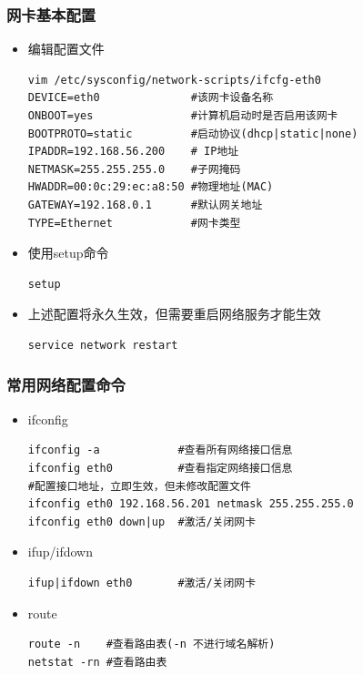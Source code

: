 \documentclass[xcolor=svgnames,presentation]{beamer}
\begin{document}
\begin{frame}[fragile]
\frametitle{网卡基本配置}
\label{sec-1-3}
\begin{itemize}

\item 编辑配置文件\\
\label{sec-1-3-1}%
\begin{verbatim}
vim /etc/sysconfig/network-scripts/ifcfg-eth0
DEVICE=eth0              #该网卡设备名称
ONBOOT=yes               #计算机启动时是否启用该网卡
BOOTPROTO=static         #启动协议(dhcp|static|none)
IPADDR=192.168.56.200    # IP地址
NETMASK=255.255.255.0    #子网掩码
HWADDR=00:0c:29:ec:a8:50 #物理地址(MAC)
GATEWAY=192.168.0.1      #默认网关地址
TYPE=Ethernet            #网卡类型
\end{verbatim}


\item 使用setup命令\\
\label{sec-1-3-2}%
\begin{verbatim}
setup
\end{verbatim}


\item 上述配置将永久生效，但需要重启网络服务才能生效\\
\label{sec-1-3-3}%
\begin{verbatim}
service network restart
\end{verbatim}

\end{itemize} %
\end{frame}
\begin{frame}[fragile]
\frametitle{常用网络配置命令}
\label{sec-1-4}
\begin{itemize}

\item ifconfig\\
\label{sec-1-4-1}%
\begin{verbatim}
ifconfig -a            #查看所有网络接口信息
ifconfig eth0          #查看指定网络接口信息
#配置接口地址，立即生效，但未修改配置文件
ifconfig eth0 192.168.56.201 netmask 255.255.255.0
ifconfig eth0 down|up  #激活/关闭网卡
\end{verbatim}


\item ifup/ifdown\\
\label{sec-1-4-2}%
\begin{verbatim}
ifup|ifdown eth0       #激活/关闭网卡
\end{verbatim}


\item route\\
\label{sec-1-4-3}%
\begin{verbatim}
route -n    #查看路由表(-n 不进行域名解析)
netstat -rn #查看路由表
\end{verbatim}

\end{itemize} %
\end{frame}
\end{document}
